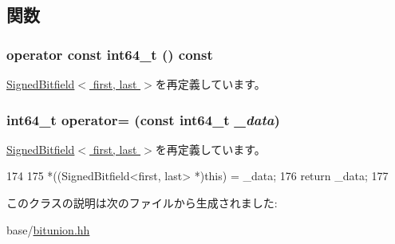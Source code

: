 \subsection{関数}
\hypertarget{classBitfieldBackend_1_1SignedBitfieldTypes_1_1SignedBitfieldWO_a44fb8a8077f66f5a72d1c16acfc80f9c}{
\subsubsection[{operator const int64\_\-t}]{\setlength{\rightskip}{0pt plus 5cm}operator const int64\_\-t () const}}
\label{classBitfieldBackend_1_1SignedBitfieldTypes_1_1SignedBitfieldWO_a44fb8a8077f66f5a72d1c16acfc80f9c}


\hyperlink{classBitfieldBackend_1_1SignedBitfieldTypes_1_1SignedBitfield_a44fb8a8077f66f5a72d1c16acfc80f9c}{SignedBitfield$<$ first, last $>$}を再定義しています。\hypertarget{classBitfieldBackend_1_1SignedBitfieldTypes_1_1SignedBitfieldWO_aa9c1202c4f5162c5214e708c80d5d4c8}{
\subsubsection[{operator=}]{\setlength{\rightskip}{0pt plus 5cm}int64\_\-t operator= (const int64\_\-t {\em \_\-data})}}
\label{classBitfieldBackend_1_1SignedBitfieldTypes_1_1SignedBitfieldWO_aa9c1202c4f5162c5214e708c80d5d4c8}


\hyperlink{classBitfieldBackend_1_1SignedBitfieldTypes_1_1SignedBitfield_aa9c1202c4f5162c5214e708c80d5d4c8}{SignedBitfield$<$ first, last $>$}を再定義しています。


\begin{DoxyCode}
174             {
175                 *((SignedBitfield<first, last> *)this) = _data;
176                 return _data;
177             }
\end{DoxyCode}


このクラスの説明は次のファイルから生成されました:\begin{DoxyCompactItemize}
\item 
base/\hyperlink{bitunion_8hh}{bitunion.hh}\end{DoxyCompactItemize}
